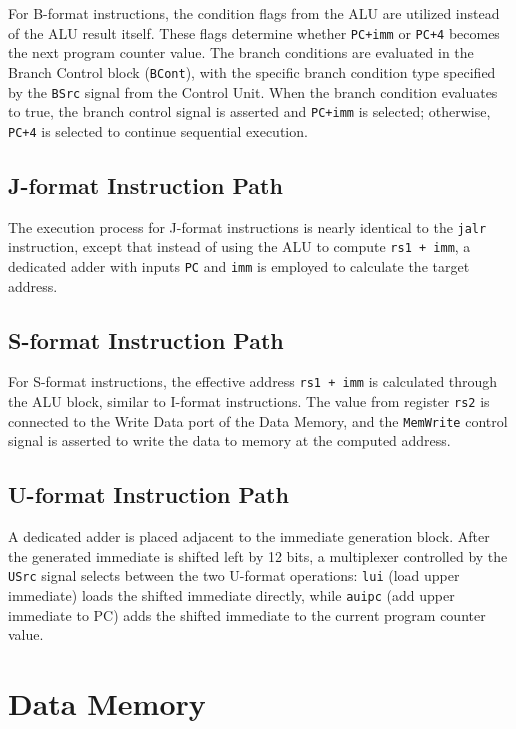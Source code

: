 \documentclass{article}
\begin{document}
For B-format instructions, the condition flags from the ALU are utilized instead of the ALU result itself. These flags determine whether \texttt{PC+imm} or \texttt{PC+4} becomes the next program counter value. The branch conditions are evaluated in the Branch Control block (\texttt{BCont}), with the specific branch condition type specified by the \texttt{BSrc} signal from the Control Unit. When the branch condition evaluates to true, the branch control signal is asserted and \texttt{PC+imm} is selected; otherwise, \texttt{PC+4} is selected to continue sequential execution.

\subsection*{J-format Instruction Path}

The execution process for J-format instructions is nearly identical to the \texttt{jalr} instruction, except that instead of using the ALU to compute \texttt{rs1 + imm}, a dedicated adder with inputs \texttt{PC} and \texttt{imm} is employed to calculate the target address.

\subsection*{S-format Instruction Path}

For S-format instructions, the effective address \texttt{rs1 + imm} is calculated through the ALU block, similar to I-format instructions. The value from register \texttt{rs2} is connected to the Write Data port of the Data Memory, and the \texttt{MemWrite} control signal is asserted to write the data to memory at the computed address.

\subsection*{U-format Instruction Path}

A dedicated adder is placed adjacent to the immediate generation block. After the generated immediate is shifted left by 12 bits, a multiplexer controlled by the \texttt{USrc} signal selects between the two U-format operations: \texttt{lui} (load upper immediate) loads the shifted immediate directly, while \texttt{auipc} (add upper immediate to PC) adds the shifted immediate to the current program counter value.

\section*{Data Memory}
\end{document}
